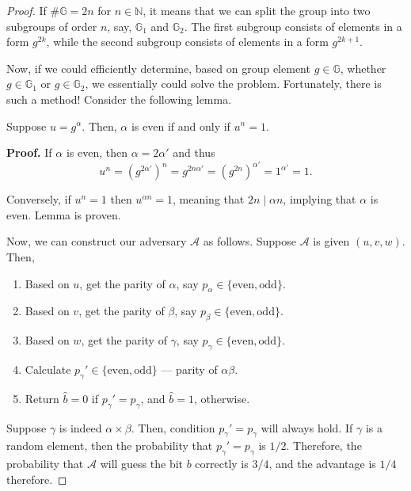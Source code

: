 \documentclass[../../book.tex]{subfiles}
\begin{document}
\begin{proof}
If $\#\mathbb{G}=2n$ for $n \in \mathbb{N}$, it means that we can split the group into two subgroups 
of order $n$, say, $\mathbb{G}_1$ and $\mathbb{G}_2$. The first subgroup consists of elements in a form $g^{2k}$, 
while the second subgroup consists of elements in a form $g^{2k+1}$.

Now, if we could efficiently determine, based on group element $g \in \mathbb{G}$, whether $g \in \mathbb{G}_1$ or 
$g \in \mathbb{G}_2$, we essentially could solve the problem. Fortunately, there is such a method! Consider the 
following lemma.

\begin{lemma}
    Suppose $u=g^{\alpha}$. Then, $\alpha$ is even if and only if $u^n = 1$.
\end{lemma}

\textbf{Proof.} If $\alpha$ is even, then $\alpha = 2\alpha'$ and thus
\begin{equation*}
    u^n = (g^{2\alpha'})^n = g^{2n\alpha'} = (g^{2n})^{\alpha'} = 1^{\alpha'} = 1.
\end{equation*}

Conversely, if $u^n = 1$ then $u^{\alpha n}=1$, meaning that $2n \mid \alpha n$, implying that $\alpha$ is even. 
Lemma is proven.

Now, we can construct our adversary $\mathcal{A}$ as follows. Suppose $\mathcal{A}$ is given $(u,v,w)$. Then,
\begin{enumerate}
    \item Based on $u$, get the parity of $\alpha$, say $p_{\alpha} \in \{\text{even}, \text{odd}\}$.
    \item Based on $v$, get the parity of $\beta$, say $p_{\beta} \in \{\text{even}, \text{odd}\}$.
    \item Based on $w$, get the parity of $\gamma$, say $p_{\gamma} \in \{\text{even}, \text{odd}\}$.
    \item Calculate $p_{\gamma}'\in \{\text{even}, \text{odd}\}$ --- parity of $\alpha\beta$.
    \item Return $\widehat{b}=0$ if $p_{\gamma}' = p_{\gamma}$, and $\widehat{b}=1$, otherwise.
\end{enumerate}

Suppose $\gamma$ is indeed $\alpha \times \beta$. Then, condition $p_{\gamma}'=p_{\gamma}$ will always hold. 
If $\gamma$ is a random element, then the probability that $p_{\gamma}'=p_{\gamma}$ is $1/2$. Therefore, the 
probability that $\mathcal{A}$ will guess the bit $b$ correctly is $3/4$, and the advantage is $1/4$ therefore. 
\end{proof}
\end{document}
